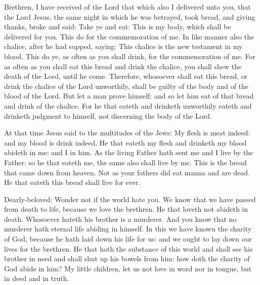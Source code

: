 \begin{multicols}{2}
\bigskip



Brethren, I have received of the Lord that which also I delivered unto you, that the
Lord Jesus, the same night in which he was betrayed, took bread, and giving
thanks, broke and said: Take ye and eat: This is my body, which shall be
delivered for you. This do for the commemoration of me.  In like manner also
the chalice, after he had supped, saying: This chalice is the new testament in
my blood. This do ye, as often as you shall drink, for the commemoration of me.
For as often as you shall eat this bread and drink the chalice, you shall shew
the death of the Lord, until he come.  Therefore, whosoever shall eat this
bread, or drink the chalice of the Lord unworthily, shall be guilty of the body
and of the blood of the Lord.    But let a man prove himself: and so let him eat of that bread and drink
of the chalice.   For he that eateth and drinketh
unworthily eateth and drinketh judgment to himself, not discerning the body of
the Lord.



At that time Jesus said to the multitudes of the Jews:
My flesh is meat indeed: and my blood is drink indeed.  He that eateth my
flesh and drinketh my blood abideth in me: and I in him.  As the living Father
hath sent me and I live by the Father: so he that eateth me, the same also
shall live by me.  This is the bread that came down from heaven. Not as your
fathers did eat manna and are dead. He that eateth this bread shall live for
ever.


\bigskip



Dearly-beloved: Wonder not if the world hate you.  We know that we have passed from
death to life, because we love the brethren. He that loveth not abideth in
death.  Whosoever hateth his brother is a murderer. And you know that no
murderer hath eternal life abiding in himself.  In this we have known the
charity of God, because he hath laid down his life for us: and we ought to lay
down our lives for the brethren.  He that hath the substance of this world and
shall see his brother in need and shall shut up his bowels from him: how doth
the charity of God abide in him?  My little children, let us not love in word
nor in tongue, but in deed and in truth.



\end{multicols}
